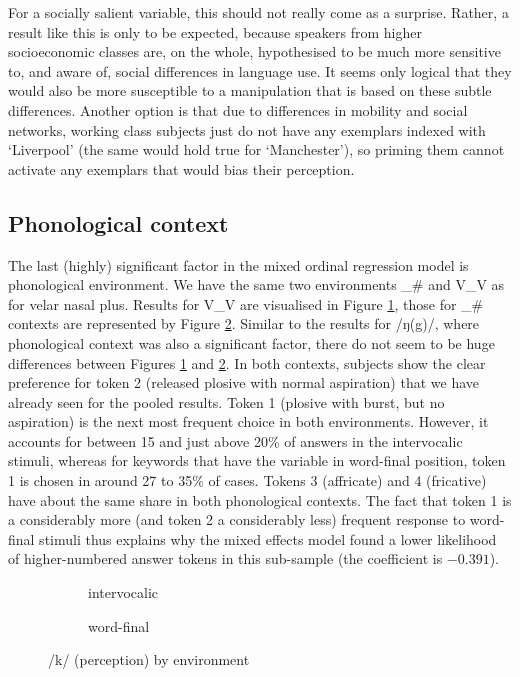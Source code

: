 For a socially salient variable, this should not really come as a surprise.
Rather, a result like this is only to be expected, because speakers from higher socioeconomic classes are, on the whole, hypothesised to be much more sensitive to, and aware of, social differences in language use.
It seems only logical that they would also be more susceptible to a manipulation that is based on these subtle differences.
Another option is that due to differences in mobility and social networks, working class subjects just do not have any exemplars indexed with `Liverpool' (the same would hold true for `Manchester'), so priming them cannot activate any exemplars that would bias their perception.

\subsection{Phonological context}
\label{sec.perc_res.k.phon}

The last (highly) significant factor in the mixed ordinal regression model is phonological environment.
We have the same two environments \_\# and V\_V as for velar nasal plus.
Results for V\_V are visualised in Figure \ref{fig.bar.k.ext.intervoc}, those for \_\# contexts are represented by Figure \ref{fig.bar.k.ext.wordfinal}.
Similar to the results for /ŋ(g)/, where phonological context was also a significant factor, there do not seem to be huge differences between Figures \ref{fig.bar.k.ext.intervoc} and \ref{fig.bar.k.ext.wordfinal}.
In both contexts, subjects show the clear preference for token 2 (released plosive with normal aspiration) that we have already seen for the pooled results.
Token 1 (plosive with burst, but no aspiration) is the next most frequent choice in both environments.
However, it accounts for between 15 and just above 20\% of answers in the intervocalic stimuli, whereas for keywords that have the variable in word-final position, token 1 is chosen in around 27 to 35\% of cases.
Tokens 3 (affricate) and 4 (fricative) have about the same share in both phonological contexts.
The fact that token 1 is a considerably more (and token 2 a considerably less) frequent response to word-final stimuli thus explains why the mixed effects model found a lower likelihood of higher-numbered answer tokens in this sub-sample (the coefficient is \ensuremath{-0.391}).

\begin{figure}[h]
	\centering
	\begin{subfigure}{0.49\textwidth}
		\centering
			\resizebox{\linewidth}{!}{} 
		\caption{intervocalic}
		\label{fig.bar.k.ext.intervoc}
	\end{subfigure}
	\begin{subfigure}{0.49\textwidth}
		\centering
			\resizebox{\linewidth}{!}{}
		\caption{word-final}
		\label{fig.bar.k.ext.wordfinal}
	\end{subfigure}
	\caption{/k/ (perception) by environment}
	\label{fig.bar.k.ext.environment}
\end{figure}

